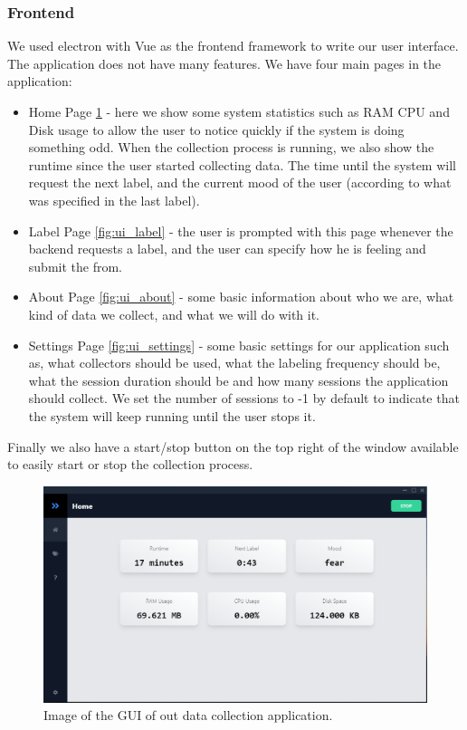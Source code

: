 \subsubsection{Frontend}

We used electron with Vue as the frontend framework to write our user interface. 
The application does not have many features. We have four main pages in the application:

\begin{itemize}
    \item Home Page \ref{fig:ui_home} - here we show some system statistics such as RAM CPU and Disk usage to allow the user to notice quickly if the system is 
        doing something odd. When the collection process is running, we also show the runtime since the user started collecting data.
        The time until the system will request the next label, and the current mood of the user (according to what was specified in the last label).
    \item Label Page \ref{fig:ui_label} - the user is prompted with this page whenever the backend requests a label, and the user can specify how he is feeling and submit the from.
    \item About Page \ref{fig:ui_about} - some basic information about who we are, what kind of data we collect, and what we will do with it.
    \item Settings Page \ref{fig:ui_settings} - some basic settings for our application such as, what collectors should be used, what the labeling frequency should be, what 
        the session duration should be and how many sessions the application should collect.
        We set the number of sessions to -1 by default to indicate that the system will keep running until the user stops it.

\end{itemize}

Finally we also have a start/stop button on the top right of the window available to easily start or stop the collection process.

\begin{figure}[htp]
    \centering
    \includegraphics[width=14cm]{figures/ui_home}   
    \caption{Image of the GUI of out data collection application.}
    \label{fig:ui_home} 
\end{figure}

